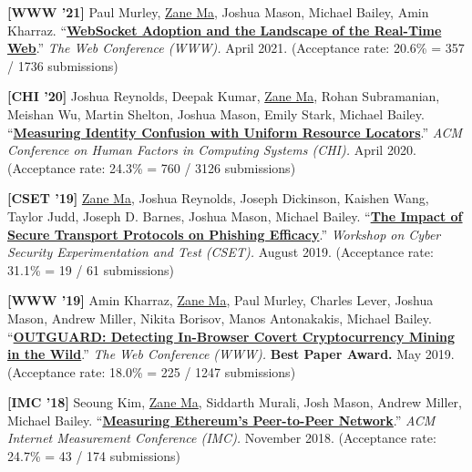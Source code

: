 \documentclass[10pt,singlecolumn]{article} %
\begin{document}
\begin{etaremune}
\item \textbf{[WWW '21]}
Paul Murley, \underline{Zane Ma}, Joshua Mason, Michael Bailey, Amin Kharraz.
``\textbf{\href{https://zanema.com/papers/www21_websockets.pdf}{WebSocket Adoption and the Landscape of the Real-Time Web}}.''
\emph{The Web Conference (WWW).} April 2021.
(Acceptance rate: 20.6\% = 357 / 1736 submissions)
\vspace{6pt}


\item \textbf{[CHI '20]}
Joshua Reynolds, Deepak Kumar, \underline{Zane Ma}, Rohan Subramanian, Meishan Wu, Martin Shelton, Joshua Mason, Emily Stark, Michael Bailey.
``\textbf{\href{https://zanema.com/papers/chi20_urlconfusion.pdf}{Measuring Identity Confusion with Uniform Resource Locators}}.''
\emph{ACM Conference on Human Factors in Computing Systems (CHI).} April 2020.
(Acceptance rate: 24.3\% = 760 / 3126 submissions)
\vspace{6pt}


\item \textbf{[CSET '19]}
\underline{Zane Ma}, Joshua Reynolds, Joseph Dickinson, Kaishen Wang, Taylor Judd, Joseph D. Barnes, Joshua Mason, Michael Bailey.
``\textbf{\href{https://zanema.com/papers/cset19_httpsphishing.pdf}{The Impact of Secure Transport Protocols on Phishing Efficacy}}.''
\emph{Workshop on Cyber Security Experimentation and Test (CSET).} August 2019.
(Acceptance rate: 31.1\% = 19 / 61 submissions)
\vspace{6pt}


\item  \textbf{[WWW '19]}
Amin Kharraz, \underline{Zane Ma}, Paul Murley, Charles Lever, Joshua Mason, Andrew Miller, Nikita Borisov, Manos Antonakakis, Michael Bailey. 
``\textbf{\href{https://zanema.com/papers/www19_cryptojacking.pdf}{OUTGUARD: Detecting In-Browser Covert Cryptocurrency Mining in the Wild}}.''
\emph{The Web Conference (WWW).} \textbf{\color{headings}Best Paper Award.} May 2019.
(Acceptance rate: 18.0\% = 225 / 1247 submissions)
\vspace{6pt}


\item \textbf{[IMC '18]}
Seoung Kim, \underline{Zane Ma}, Siddarth Murali, Josh Mason, Andrew Miller, Michael Bailey.
``\textbf{\href{https://zanema.com/papers/imc18_ethpeers.pdf}{Measuring Ethereum's Peer-to-Peer Network}}.''
\emph{ACM Internet Measurement Conference (IMC).} November 2018.
(Acceptance rate: 24.7\% = 43 / 174 submissions)
\vspace{6pt}


\end{etaremune}
\end{document}
